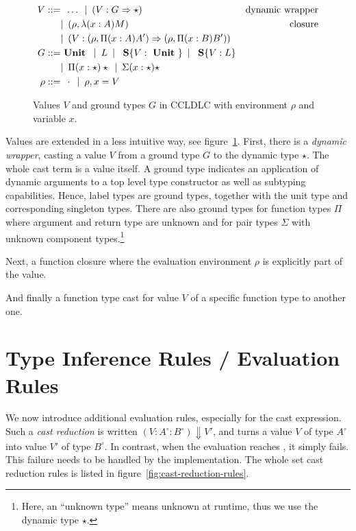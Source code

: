 \begin{figure}
\begin{align*}
 V ::= & \enspace \dots \enspace
        |\enspace (V : G \Rightarrow \star) & \text{dynamic wrapper}\\
      & |\enspace (\rho, \lambda(x:A)M) & \text{closure} \\
      & |\enspace (V : (\rho, \Pi(x:A) A') \Rightarrow (\rho, \Pi(x:B) B') ) \\
 G ::= & \text{ \textbf{Unit} } \enspace|\enspace
    L \enspace|\enspace
    \text{ \textbf{S}}\{V: \text{ \textbf{Unit} }\} \enspace|\enspace
    \text{ \textbf{S}}\{V: L\} \\
    & |\enspace
    \Pi(x:\star)\star \enspace|\enspace
    \Sigma(x:\star)\star \\
 \rho ::= & \enspace \cdot \enspace|\enspace \rho, x = V
\end{align*}
\caption{Values $V$ and ground types $G$ in CCLDLC with environment $\rho$ and variable $x$.}
\label{fig:ccldlc-extensions-values}
\end{figure}

Values are extended in a less intuitive way, see figure~\ref{fig:ccldlc-extensions-values}. First, there is a \emph{dynamic wrapper}, casting a value $V$ from a ground type $G$ to the dynamic type $\star$. The whole cast term is a value itself. A ground type indicates an application of dynamic arguments to a top level type constructor as well as subtyping capabilities. Hence, label types are ground types, together with the unit type and corresponding singleton types. There are also ground types for function types $\Pi$ where argument and return type are unknown and for pair types $\Sigma$ with unknown component types.\footnote{Here, an ``unknown type'' means unknown at runtime, thus we use the dynamic type $\star$.}

Next, a function closure where the evaluation environment $\rho$ is explicitly part of the value.

And finally a function type cast for value $V$ of a specific function type to another one. 

\section{Type Inference Rules / Evaluation Rules}\label{sec:ccldlc-inference-rules}

We now introduce additional evaluation rules, especially for the cast expression. Such a \emph{cast reduction} is written $(V : A^\circ : B^\circ) \Downarrow V'$, and turns a value $V$ of type $A^\circ$ into value $V'$ of type $B^\circ$. In contrast, when the evaluation reaches \blame, it simply fails. This failure needs to be handled by the implementation. The whole set cast reduction rules is listed in figure~\ref{fig:cast-reduction-rules}.

